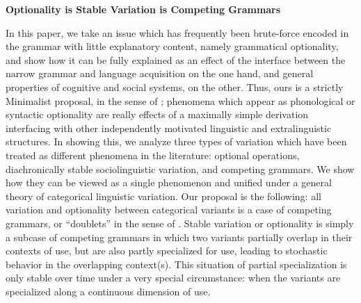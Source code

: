 \documentclass[a4paper,aps,prl,12pt,tightenlines,superscriptaddress]{revtex4}
\title{}%
\begin{document}
\begin{center} \textbf{Optionality is Stable Variation is Competing Grammars}  \end{center}


\noindent In this paper, we take an issue which has frequently been brute-force encoded in the grammar with little explanatory content, namely grammatical optionality, and show how it can be fully explained as an effect of the interface between the narrow grammar and language acquisition on the one hand, and general properties of cognitive and social systems, on the other.
Thus, ours is a strictly Minimalist proposal, in the sense of \citet[][and subsequent]{chomsky1993, chomsky2001}; phenomena which appear as phonological or syntactic optionality are really effects of a maximally simple derivation interfacing with other independently motivated linguistic and extralinguistic structures. In showing this, we analyze three types of variation which have been treated as different phenomena in the literature: optional operations, diachronically stable sociolinguistic variation, and competing grammars. We show how they can be viewed as a single phenomenon and unified under a general theory of categorical linguistic variation. 
Our proposal is the following: all variation and optionality between categorical variants is a case of competing grammars, or ``doublets'' in the sense of \citet{kroch1994}. 
Stable variation or optionality is simply a subcase of competing grammars in which two variants partially overlap in their contexts of use, but are also partly specialized for use, leading to stochastic behavior in the overlapping context(s). 
This situation of partial specialization is only stable over time under a very special circumstance: when the variants are specialized along a continuous dimension of use.%
\end{document}
